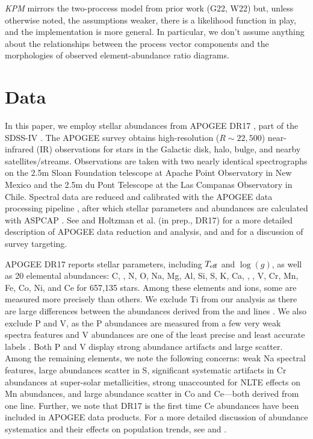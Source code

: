 \documentclass[modern]{aastex631}
\newcommand{\logg}{\log(g)}
\newcommand{\teff}{T_{\rm eff}}
\newcommand{\name}{\textsl{KPM}}
\begin{document}
\bigskip
\name{} mirrors the two-proccess model from prior work (G22, W22) but, unless otherwise noted, the assumptions weaker, there is a likelihood function in play, and the implementation is more general.
In particular, we don't assume anything about the relationships between the process vector components and the morphologies of observed element-abundance ratio diagrams.

\section{Data}\label{sec:data}

In this paper, we employ stellar abundances from APOGEE DR17 \citep{abdurrouf2022}, part of the SDSS-IV \citep{majewski2017}. The APOGEE survey obtains high-resolution ($R\sim22,500$) near-infrared (IR) observations \citep{wilson2019} for stars in the Galactic disk, halo, bulge, and nearby satellites/streams. Observations are taken with two nearly identical spectrographs on the 2.5m Sloan Foundation telescope \citep{wilson2019} at Apache Point Observatory in New Mexico and the 2.5m du Pont Telescope \citep{bowen1973} at the Las Companas Observatory in Chile. Spectral data are reduced and calibrated with the APOGEE data processing pipeline \citep{nidever2015}, after which stellar parameters and abundances are calculated with ASPCAP \citep[APOGEE Stellar Parameter and Chemical Abundance Pipeline;][]{holtzman2015, garcia2016}. See \citet[][DR16]{jonsson2020} and Holtzman et al. (in prep., DR17) for a more detailed description of APOGEE data reduction and analysis, and \citet{zasowski2013, zasowski2017} and \citet{santana2021} for a discussion of survey targeting.

APOGEE DR17 reports stellar parameters, including $\teff$ and $\logg$, as well as 20 elemental abundances: C, , N, O, Na, Mg, Al, Si, S, K, Ca, , , V, Cr, Mn, Fe, Co, Ni, and Ce for 657,135 stars. Among these elements and ions, some are measured more precisely than others. We exclude Ti from our analysis as there are large differences between the abundances derived from the  and  lines \citep{jonsson2020}. We also exclude P and V, as the P abundances are measured from a few very weak spectra features and V abundances are one of the least precise and least accurate labels \citep{jonsson2020}. Both P and V display strong abundance artifacts and large scatter. Among the remaining elements, we note the following concerns: weak Na spectral features, large abundances scatter in S, significant systematic artifacts in Cr abundances at super-solar metallicities, strong unaccounted for NLTE effects on Mn abundances, and large abundance scatter in Co and Ce---both derived from one line. Further, we note that DR17 is the first time Ce abundances have been included in APOGEE data products. For a more detailed discussion of abundance systematics and their effects on population trends, see \citet{jonsson2020} and \citet{griffith2021a}.
\end{document}
